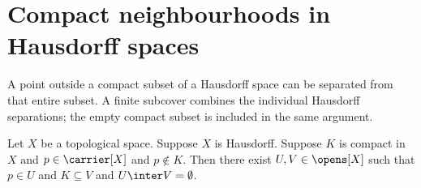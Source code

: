 \section{Compact neighbourhoods in Hausdorff spaces}





A point outside a compact subset of a Hausdorff space can be separated from
that entire subset. A finite subcover combines the individual Hausdorff
separations; the empty compact subset is included in the same argument.

\begin{theorem}\label{hausdorff_point_compact_separation}
    Let $X$ be a topological space.
    Suppose $X$ is Hausdorff.
    Suppose $K$ is compact in $X$ and $p\in\carrier[X]$ and $p\notin K$.
    Then there exist $U,V\in\opens[X]$ such that
        $p\in U$ and $K\subseteq V$ and $U\inter V=\emptyset$.
\end{theorem}
